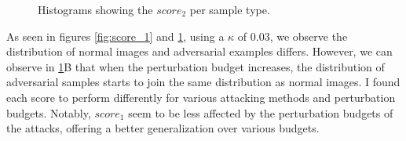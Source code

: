 \begin{figure}[htp]


    \caption{Histograms showing the $score_{2}$ per sample type.}
    \label{fig:score_2}
\end{figure}

As seen in figures \ref{fig:score_1} and \ref{fig:score_2}, using a $\kappa$ of
$0.03$, we observe the distribution of normal images and adversarial examples
differs. However, we can observe in \ref{fig:score_2}B that when the
perturbation budget increases, the distribution of adversarial samples starts to
join the same distribution as normal images. I found each score to perform
differently for various attacking methods and perturbation budgets. Notably,
$score_{1}$ seem to be less affected by the perturbation budgets of the attacks,
offering a better generalization over various budgets.

